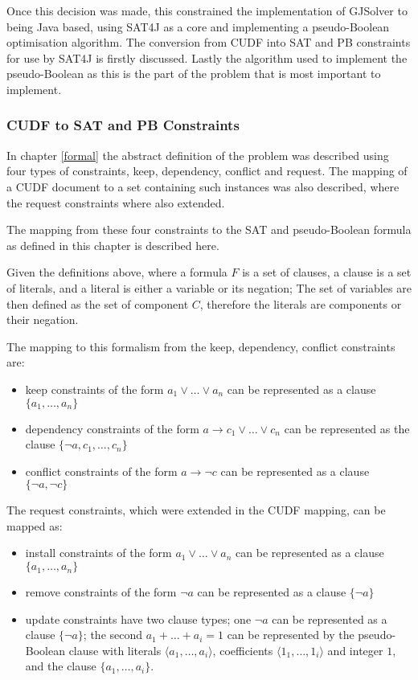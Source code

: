 Once this decision was made, this constrained the implementation of GJSolver to being Java based, 
using SAT4J as a core and implementing a pseudo-Boolean optimisation algorithm.
The conversion from CUDF into SAT and PB constraints for use by SAT4J is firstly discussed.
Lastly the algorithm used to implement the pseudo-Boolean as this is the part of the problem that is most important to implement.

\subsubsection{CUDF to SAT and PB Constraints}
In chapter \ref{formal} the abstract definition of the problem was described using four types of constraints, keep, dependency, conflict and request.
The mapping of a CUDF document to a set containing such instances was also described, where the request constraints where also extended.

The mapping from these four constraints to the SAT and pseudo-Boolean formula as defined in this chapter is described here.

Given the definitions above, where a formula $F$ is a set of clauses, a clause is a set of literals, and a literal is either a variable or its negation;
The set of variables are then defined as the set of component $C$, therefore the literals are components or their negation.

The mapping to this formalism from the keep, dependency, conflict constraints are: 
\begin{itemize}
  \item keep constraints of the form $a_1\vee \ldots \vee a_n$  can be represented as a clause $\{a_1,\ldots,a_n\}$
  \item dependency constraints of the form $a \rightarrow c_1 \vee \ldots \vee c_n$ can be represented as the clause $\{\neg a, c_1, \ldots, c_n\}$
  \item conflict constraints of the form $a \rightarrow \neg c$ can be represented as a clause $\{\neg a, \neg c\}$
\end{itemize}

The request constraints, which were extended in the CUDF mapping, can be mapped as:
\begin{itemize}
      \item install constraints of the form $a_1 \vee \ldots \vee a_n$  can be represented as a clause $\{a_1,\ldots,a_n\}$
      \item remove constraints of the form $\neg a$ can be represented as a clause $\{\neg a\}$
      \item update constraints have two clause types; one $\neg a$ can be represented as a clause $\{\neg a\}$;
      the second $a_1 + \ldots + a_i = 1$ can be represented by the pseudo-Boolean clause with literals $\langle a_1,\ldots,a_i\rangle$, coefficients $\langle 1_1,\ldots,1_i \rangle$
      and integer $1$, and the clause $\{a_1,\ldots,a_i\}$.
\end{itemize}


